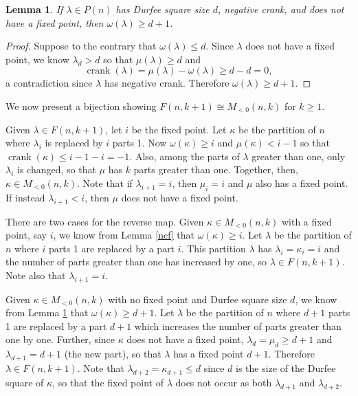 \documentclass{amsart}
\theoremstyle{theorem}
\newtheorem{lemma}[theorem]{Lemma}
\theoremstyle{definition}
\DeclareMathOperator{\ck}{crank}
\begin{document}
\begin{lemma} \label{ncg}
If $\lambda \in P(n)$ has Durfee square size $d$, negative crank, and does not have a fixed point, then $\omega(\lambda) \ge d+1$.
\end{lemma}
\begin{proof}
Suppose to the contrary that $\omega(\lambda) \le d$.  Since $\lambda$ does not have a fixed point, we know $\lambda_d > d$ so that $\mu(\lambda) \ge d$ and
\[\ck(\lambda) = \mu(\lambda) - \omega(\lambda) \ge d - d = 0,\]
a contradiction since $\lambda$ has negative crank.  Therefore $\omega(\lambda) \ge d+1$.
\end{proof}

We now present a bijection showing
$F(n,k+1) \cong M_{<0}(n,k)$ for $k \ge 1$.

Given $\lambda \in F(n,k+1)$, let $i$ be the fixed point.  Let $\kappa$ be the partition of $n$ where $\lambda_i$ is replaced by $i$ parts 1.  Now $\omega(\kappa) \ge i$ and $\mu(\kappa) < i - 1$ so that $\ck(\kappa) \le i-1 - i = -1$.  Also, among the parts of $\lambda$ greater than one, only $\lambda_i$ is changed, so that $\mu$ has $k$ parts greater than one.  Together, then, $\kappa \in M_{<0}(n,k)$.  Note that if $\lambda_{i+1} = i$, then $\mu_i = i$ and $\mu$ also has a fixed point.  If instead $\lambda_{i+1} < i$, then $\mu$ does not have a fixed point.

There are two cases for the reverse map.  Given $\kappa \in M_{<0}(n,k)$ with a fixed point, say $i$, we know from Lemma \ref{ncf} that $\omega(\kappa) \ge i$.  Let $\lambda$ be the partition of $n$ where $i$ parts 1 are replaced by a part $i$.  This partition $\lambda$ has $\lambda_i = \kappa_i = i$ and the number of parts greater than one has increased by one, so $\lambda \in F(n,k+1)$.  Note also that $\lambda_{i+1} = i$.

Given $\kappa \in M_{<0}(n,k)$ with no fixed point and Durfee square size $d$, we know from Lemma \ref{ncg} that $\omega(\kappa) \ge d+1$.  Let $\lambda$ be the partition of $n$ where $d+1$ parts 1 are replaced by a part $d+1$ which increases the number of parts greater than one by one.  Further, since $\kappa$ does not have a fixed point, $\lambda_d = \mu_d \ge d+1$ and $\lambda_{d+1} = d+1$ (the new part), so that $\lambda$ has a fixed point $d+1$.  Therefore $\lambda \in F(n,k+1)$.  Note that $\lambda_{d+2} = \kappa_{d+1} \le d$ since $d$ is the size of the Durfee square of $\kappa$, so that the fixed point of $\lambda$ does not occur as both $\lambda_{d+1}$ and $\lambda_{d+2}$.
\end{document}
